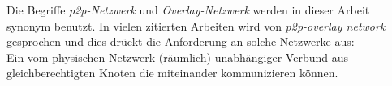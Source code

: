 Die Begriffe \emph{p2p-Netzwerk} und \emph{Overlay-Netzwerk} werden in dieser Arbeit synonym benutzt. In vielen zitierten Arbeiten wird von \emph{p2p-overlay network} gesprochen und dies drückt die Anforderung an solche Netzwerke aus:\\
Ein vom physischen Netzwerk (räumlich) unabhängiger Verbund aus gleichberechtigten Knoten die miteinander kommunizieren können.









